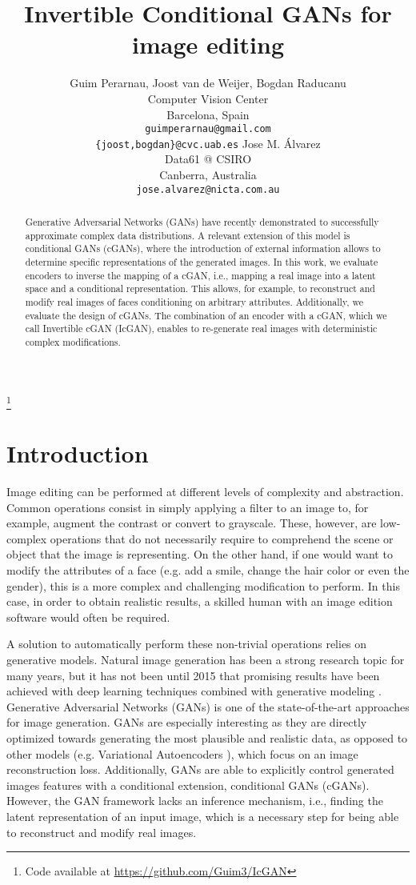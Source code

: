 \documentclass{article}
\title{Invertible Conditional GANs for image editing}
\author{
    Guim Perarnau, Joost van de Weijer, Bogdan Raducanu \\
  Computer Vision Center\\
  Barcelona, Spain \\
  \texttt{guimperarnau@gmail.com} \\
  \texttt{\{joost,bogdan\}@cvc.uab.es}
  \And
   Jose M. \'Alvarez \\
   Data61 @ CSIRO\\
   Canberra, Australia \\
  \texttt{jose.alvarez@nicta.com.au} \\
}
\newcommand\blfootnote[1]{\begingroup
  \renewcommand\thefootnote{}\footnote{#1}\addtocounter{footnote}{-1}\endgroup
}
\begin{document}
\blfootnote{Code available at \url{https://github.com/Guim3/IcGAN}}
\maketitle

\begin{abstract}
Generative Adversarial Networks (GANs) have recently demonstrated to successfully approximate complex data distributions. A relevant extension of this model is conditional GANs (cGANs), where the introduction of external information allows to determine specific representations of the generated images. In this work, we evaluate encoders to inverse the mapping of a cGAN, i.e., mapping a real image into a latent space and a conditional representation. This allows, for example, to reconstruct and modify real images of faces conditioning on arbitrary attributes. Additionally, we evaluate the design of cGANs. The combination of an encoder with a cGAN, which we call Invertible cGAN (IcGAN), enables to re-generate real images with deterministic complex modifications. \end{abstract}

\section{Introduction} \label{sec:intro}
Image editing can be performed at different levels of complexity and abstraction. Common operations consist in simply applying a filter to an image to, for example, augment the contrast or convert to grayscale. These, however, are low-complex operations that do not necessarily require to comprehend the scene or object that the image is representing. On the other hand, if one would want to modify the attributes of a face (e.g. add a smile, change the hair color or even the gender), this is a more complex and challenging modification to perform. In this case, in order to obtain realistic results, a skilled human with an image edition software would often be required.

A solution to automatically perform these non-trivial operations relies on generative models. Natural image generation has been a strong research topic for many years, but it has not been until 2015 that promising results have been achieved with deep learning techniques combined with generative modeling \citep{Gregor2015,Radford2015}. Generative Adversarial Networks (GANs) \cite{Goodfellow2014} is one of the state-of-the-art approaches for image generation. GANs are especially interesting as they are directly optimized towards generating the most plausible and realistic data, as opposed to other models (e.g. Variational Autoencoders \cite{Kingma2013}), which focus on an image reconstruction loss. Additionally, GANs are able to explicitly control generated images features with a conditional extension, conditional GANs (cGANs). However, the GAN framework lacks an inference mechanism, i.e., finding the latent representation of an input image, which is a necessary step for being able to reconstruct and modify real images.
\end{document}
